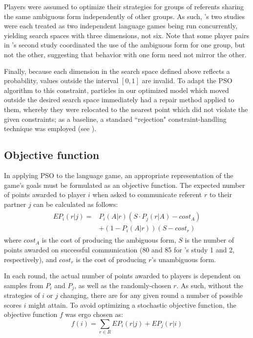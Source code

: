 \documentclass[a4paper,11pt]{article}
\begin{document}
Players were assumed to optimize their strategies for groups of referents sharing the same ambiguous form independently of other groups. As such, \citeauthor{rohde2012}'s two studies were each treated as two independent language games being run concurrently, yielding search spaces with three dimensions, not six. Note that some player pairs in \citeauthor{rohde2012}'s second study coordinated the use of the ambiguous form for one group, but not the other, suggesting that behavior with one form need not mirror the other.

Finally, because each dimension in the search space defined above reflects a probability, values outside the interval $[0, 1]$ are invalid. To adapt the PSO algorithm to this constraint, particles in our optimized model which moved outside the desired search space immediately had a repair method applied to them, whereby they were relocated to the nearest point which did not violate the given constraints; as a baseline, a standard ``rejection" constraint-handling technique was employed (see ).
 
\subsection{Objective function}
\label{sec:objective_func}
In applying PSO to the \citeauthor{rohde2012} language game, an appropriate representation of the game's goals must be formulated as an objective function. The expected number of points awarded to player $i$ when asked to communicate referent $r$ to their partner $j$ can be calculated as follows:
\begin{multline}
\begin{split}
EP_{i}(r|j) = & P_i(A|r)(S \cdot P_j(r|A) - cost_A) \\
              & + (1 - P_i(A|r))(S - cost_r) 
\end{split}
\end{multline}
where $cost_A$ is the cost of producing the ambiguous form, $S$ is the number of points awarded on successful communication (80 and 85 for \citeauthor{rohde2012}'s study 1 and 2, respectively), and $cost_r$ is the cost of producing $r$'s unambiguous form.

In each round, the actual number of points awarded to players is dependent on samples from $P_i$ and $P_j$, as well as the randomly-chosen $r$. As such, without the strategies of $i$ or $j$ changing, there are for any given round a number of possible scores $i$ might attain. To avoid optimizing a stochastic objective function, the objective function $f$ was ergo chosen as:
\begin{equation}
f(i) = \sum_{r \in R} EP_{i}(r|j) + EP_{j}(r|i)
\end{equation}
\end{document}
